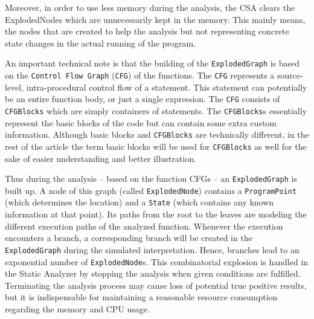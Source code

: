 \documentclass[oneside, a4paper, 12pt]{article}
\theoremstyle{definition}
\begin{document}
Moreover, in order to use less memory during the analysis, the CSA clears the ExplodedNodes which are unnecessarily kept in the memory. This mainly means, the nodes that are created to help the analysis but not representing concrete state changes in the actual running of the program.

An important technical note is that the building 
of the \texttt{ExplodedGraph} is based on the \texttt{Control Flow Graph} 
(\texttt{CFG}) of the functions. The \texttt{CFG} represents a source-level, 
intra-procedural control flow of a 
statement. This statement can potentially be an entire function body, or just a 
single expression. The \texttt{CFG} consists of \texttt{CFGBlocks} which are 
simply containers of statements. The \texttt{CFGBlocks}s essentially represent 
the basic blocks of the code but can contain some extra custom information. 
Although basic blocks and \texttt{CFGBlocks} are technically different, in the 
rest of the article the term basic blocks will be used for \texttt{CFGBlocks} 
as well for the sake of easier understanding and better illustration.

Thus during the analysis -- based on the function CFGs -- an 
\texttt{ExplodedGraph} is built up. A 
node of this graph (called \texttt{ExplodedNode}) contains a 
\texttt{ProgramPoint} (which determines the location) and a \texttt{State} 
(which contains any known information at that point). Its paths from the root 
to the leaves are modeling the different execution paths of the analyzed 
function. Whenever the execution encounters a branch, a corresponding branch 
will be created in the \texttt{ExplodedGraph} during the simulated 
interpretation.
Hence, branches lead to an exponential number of \texttt{ExplodedNode}s.
This combinatorial explosion is handled in the Static Analyzer by stopping 
the analysis when given conditions are fulfilled. Terminating the analysis 
process may cause loss of potential true positive results, but it is 
indispensable for maintaining a reasonable resource consumption regarding the 
memory and CPU usage. 
\end{document}
